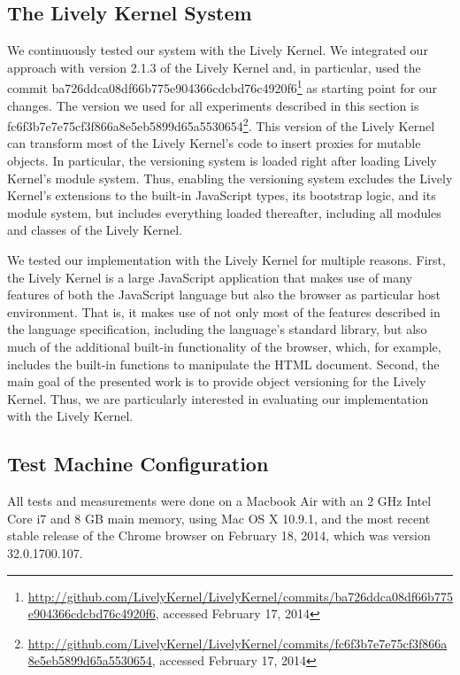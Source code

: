 \subsection{The Lively Kernel System}

We continuously tested our system with the Lively Kernel.
We integrated our approach with version 2.1.3 of the Lively Kernel and, in particular, used the commit ba726ddca08df66b775e904366cdcbd76c4920f6\footnote{\url{http://github.com/LivelyKernel/LivelyKernel/commits/ba726ddca08df66b775e904366cdcbd76c4920f6}, accessed February 17, 2014} as starting point for our changes.
The version we used for all experiments described in this section is fc6f3b7e7e75cf3f866a8e5eb5899d65a5530654\footnote{\url{http://github.com/LivelyKernel/LivelyKernel/commits/fc6f3b7e7e75cf3f866a8e5eb5899d65a5530654}, accessed February 17, 2014}.
This version of the Lively Kernel can transform most of the Lively Kernel's code to insert proxies for mutable objects.
In particular, the versioning system is loaded right after loading Lively Kernel's module system.
Thus, enabling the versioning system excludes the Lively Kernel's extensions to the built-in JavaScript types, its bootstrap logic, and its module system, but includes everything loaded thereafter, including all modules and classes of the Lively Kernel.

We tested our implementation with the Lively Kernel for multiple reasons.
First, the Lively Kernel is a large JavaScript application that makes use of many features of both the JavaScript language but also the browser as particular host environment.
That is, it makes use of not only most of the features described in the language specification, including the language's standard library, but also much of the additional built-in functionality of the browser, which, for example, includes the built-in functions to manipulate the HTML document.
Second, the main goal of the presented work is to provide object versioning for the Lively Kernel.
Thus, we are particularly interested in evaluating our implementation with the Lively Kernel.


\subsection{Test Machine Configuration}

All tests and measurements were done on a Macbook Air with an 2 GHz Intel Core i7 and 8 GB main memory, using Mac OS X 10.9.1, and the most recent stable release of the Chrome browser on February 18, 2014, which was version 32.0.1700.107.

